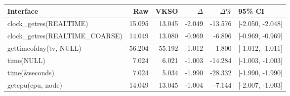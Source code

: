 \begin{tabular}{lrrrrl}
\toprule
Interface & Raw & VKSO & $\Delta$ & $\Delta\%$ & 95\% CI \\
\midrule
clock\_getres(REALTIME) & 15.095 & 13.045 & -2.049 & -13.576 & [-2.050, -2.048] \\
clock\_getres(REALTIME\_COARSE) & 14.049 & 13.080 & -0.969 & -6.896 & [-0.969, -0.969] \\
gettimeofday(tv, NULL) & 56.204 & 55.192 & -1.012 & -1.800 & [-1.012, -1.011] \\
time(NULL) & 7.024 & 6.021 & -1.003 & -14.284 & [-1.003, -1.003] \\
time(\&seconds) & 7.024 & 5.034 & -1.990 & -28.332 & [-1.990, -1.990] \\
getcpu(cpu, node) & 14.049 & 13.045 & -1.004 & -7.144 & [-2.007, -1.003] \\
\bottomrule
\end{tabular}
